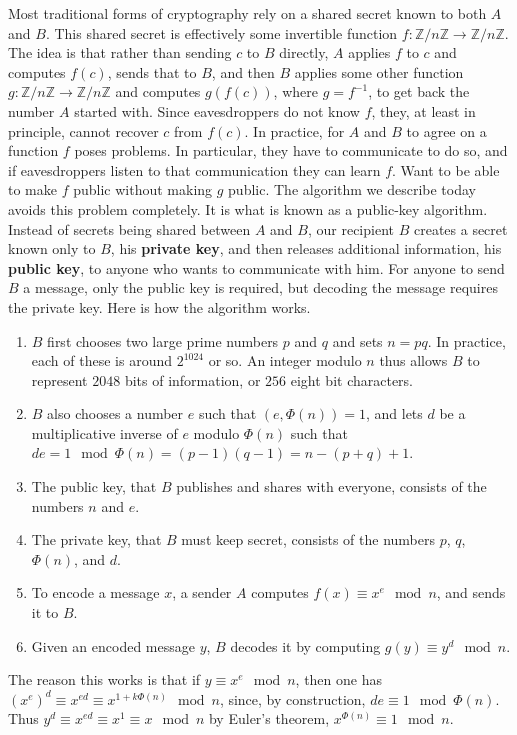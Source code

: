 \documentclass{article}
\newcommand{\Z}{\mathbb{Z}}
\newcommand{\rb}[1]{\left( #1 \right)}
\theoremstyle{definition}\newtheorem{definition}{Definition}
\theoremstyle{definition}\newtheorem{remark}[definition]{Remark}
\theoremstyle{definition}\newtheorem*{example}{Example}
\theoremstyle{definition}\newtheorem*{note}{Note}
\begin{document}
Most traditional forms of cryptography rely on a shared secret known to both $ A $ and $ B $. This shared secret is effectively some invertible function $ f : \Z / n\Z \to \Z / n\Z $. The idea is that rather than sending $ c $ to $ B $ directly, $ A $ applies $ f $ to $ c $ and computes $ f\rb{c} $, sends that to $ B $, and then $ B $ applies some other function $ g : \Z / n\Z \to \Z / n\Z $ and computes $ g\rb{f\rb{c}} $, where $ g = f^{-1} $, to get back the number $ A $ started with. Since eavesdroppers do not know $ f $, they, at least in principle, cannot recover $ c $ from $ f\rb{c} $. In practice, for $ A $ and $ B $ to agree on a function $ f $ poses problems. In particular, they have to communicate to do so, and if eavesdroppers listen to that communication they can learn $ f $. Want to be able to make $ f $ public without making $ g $ public. The algorithm we describe today avoids this problem completely. It is what is known as a public-key algorithm. Instead of secrets being shared between $ A $ and $ B $, our recipient $ B $ creates a secret known only to $ B $, his \textbf{private key}, and then releases additional information, his \textbf{public key}, to anyone who wants to communicate with him. For anyone to send $ B $ a message, only the public key is required, but decoding the message requires the private key. Here is how the algorithm works.
\begin{enumerate}
\item $ B $ first chooses two large prime numbers $ p $ and $ q $ and sets $ n = pq $. In practice, each of these is around $ 2^{1024} $ or so. An integer modulo $ n $ thus allows $ B $ to represent $ 2048 $ bits of information, or $ 256 $ eight bit characters.
\item $ B $ also chooses a number $ e $ such that $ \rb{e, \Phi\rb{n}} = 1 $, and lets $ d $ be a multiplicative inverse of $ e $ modulo $ \Phi\rb{n} $ such that $ de = 1 \mod \Phi\rb{n} = \rb{p - 1}\rb{q - 1} = n - \rb{p + q} + 1 $.
\item The public key, that $ B $ publishes and shares with everyone, consists of the numbers $ n $ and $ e $.
\item The private key, that $ B $ must keep secret, consists of the numbers $ p $, $ q $, $ \Phi\rb{n} $, and $ d $.
\item To encode a message $ x $, a sender $ A $ computes $ f\rb{x} \equiv x^e \mod n $, and sends it to $ B $.
\item Given an encoded message $ y $, $ B $ decodes it by computing $ g\rb{y} \equiv y^d \mod n $.
\end{enumerate}
The reason this works is that if $ y \equiv x^e \mod n $, then one has $ \rb{x^e}^d \equiv x^{ed} \equiv x^{1 + k\Phi\rb{n}} \mod n $, since, by construction, $ de \equiv 1 \mod \Phi\rb{n} $. Thus $ y^d \equiv x^{ed} \equiv x^1 \equiv x \mod n $ by Euler's theorem, $ x^{\Phi\rb{n}} \equiv 1 \mod n $.
\end{document}
